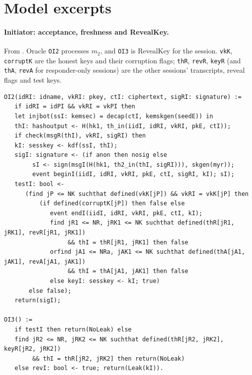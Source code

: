 \section{Model excerpts}\label{app:excerpts}

\paragraph{Initiator: acceptance, freshness and RevealKey.} From
. Oracle \texttt{OI2} processes $m_2$, and \texttt{OI3}
is RevealKey for the session. \texttt{vkK}, \texttt{corruptK} are the honest
keys and their corruption flags; \texttt{thR}, \texttt{revR}, \texttt{keyR}
(and \texttt{thA}, \texttt{revA} for responder-only sessions) are the other
sessions' transcripts, reveal flags and test keys.
\begin{lstlisting}
OI2(idRI: idname, vkRI: pkey, ctI: ciphertext, sigRI: signature) :=
   if idRI = idPI && vkRI = vkPI then
   let injbot(ssI: kemsec) = decap(ctI, kemskgen(seedE)) in
   thI: hashoutput <- H(hk1, th_in(iidI, idRI, vkRI, pkE, ctI));
   if check(msgR(thI), vkRI, sigRI) then
   kI: sesskey <- kdf(ssI, thI);
   sigI: signature <- (if anon then nosig else
        sI <- sign(msgI(H(hk1, th2_in(thI, sigRI))), skgen(myr));
        event beginI(iidI, idRI, vkRI, pkE, ctI, sigRI, kI); sI);
   testI: bool <-
      (find jP <= NK suchthat defined(vkK[jP]) && vkRI = vkK[jP] then
          (if defined(corruptK[jP]) then false else
             event endI(iidI, idRI, vkRI, pkE, ctI, kI);
             find jR1 <= NR, jRK1 <= NK suchthat defined(thR[jR1, jRK1], revR[jR1, jRK1])
                  && thI = thR[jR1, jRK1] then false
             orfind jA1 <= NRa, jAK1 <= NK suchthat defined(thA[jA1, jAK1], revA[jA1, jAK1])
                  && thI = thA[jA1, jAK1] then false
             else keyI: sesskey <- kI; true)
       else false);
   return(sigI);

OI3() :=
   if testI then return(NoLeak) else
   find jR2 <= NR, jRK2 <= NK suchthat defined(thR[jR2, jRK2], keyR[jR2, jRK2])
        && thI = thR[jR2, jRK2] then return(NoLeak)
   else revI: bool <- true; return(Leak(kI)).
\end{lstlisting}

